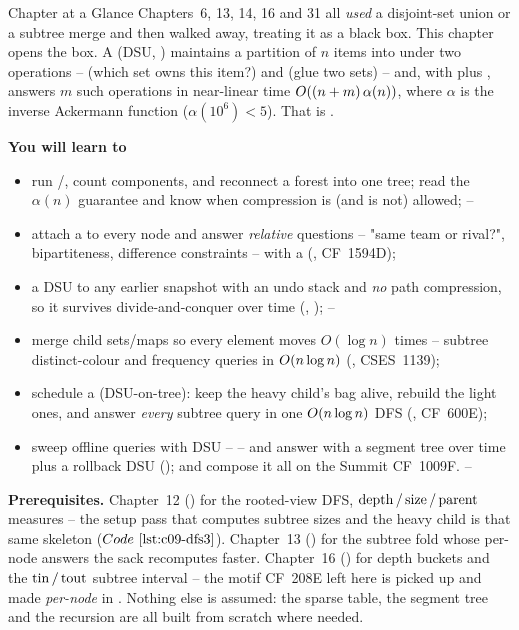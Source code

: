 \begin{chaptertheorybox}{Chapter at a Glance}
Chapters~6, 13, 14, 16 and 31 all \emph{used} a disjoint-set union or a
subtree merge and then walked away, treating it as a black box.  This
chapter opens the box.  A  (DSU, )
maintains a partition of \(n\) items into  under two
operations --  (which set owns this item?) and  (glue
two sets) -- and, with  plus ,
answers \(m\) such operations in near-linear time \(O((n+m)\,\alpha(n))\),
where \(\alpha\) is the inverse Ackermann function (\(\alpha(10^6)<5\)).  That
is .

\textbf{You will learn to}
\begin{itemize}[nosep]
  \item run /, count components, and reconnect a
        forest into one tree; read the \(\alpha(n)\) guarantee and know when
        compression is (and is not) allowed; \hfill{}--
  \item attach a  to every node and answer \emph{relative}
        questions -- "same team or rival?", bipartiteness, difference
        constraints -- with a  (,
        CF~1594D); \hfill{}
  \item {} a DSU to any earlier snapshot with an undo stack and
        \emph{no} path compression, so it survives divide-and-conquer over
        time (, ); \hfill{}--
  \item merge child sets/maps  so every element moves
        \(O(\log n)\) times -- subtree distinct-colour and frequency queries
        in \(O(n\log n)\) (, CSES~1139); \hfill{}
  \item schedule a  (DSU-on-tree): keep the heavy child's bag
        alive, rebuild the light ones, and answer \emph{every} subtree query
        in one \(O(n\log n)\) DFS (, CF~600E); \hfill{}
  \item sweep offline queries with DSU --  --
        and answer  with a segment tree
        over time plus a rollback DSU (); and compose it
        all on the Summit CF~1009F. \hfill{}--
\end{itemize}

\textbf{Prerequisites.} Chapter~12 () for the rooted-view DFS,
\(\operatorname{depth}/\operatorname{size}/\operatorname{parent}\) measures -- the setup pass that computes subtree
sizes and the heavy child is that same skeleton (\(\coderef{c09-dfs3}\)).
Chapter~13 () for the subtree fold whose per-node answers the sack
recomputes faster.  Chapter~16 () for depth buckets and the
\(\operatorname{tin}/\operatorname{tout}\) subtree interval -- the motif CF~208E left here is picked up
and made \emph{per-node} in .  Nothing else is assumed: the
sparse table, the segment tree and the recursion are all built from scratch
where needed.
\end{chaptertheorybox}

